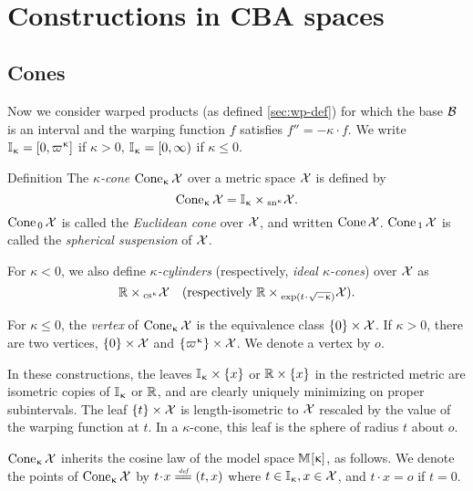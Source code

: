­%
\chapter{Constructions in CBA spaces}


\section{Cones} 
\label{sec:cones}

Now we consider warped products (as defined  \ref{sec:wp-def}) for which the base $\mathcal{B}$ is an interval   and the warping function $f$ satisfies $f''=-\kappa\cdot f$.  We write  $\II_\kappa= [0,\varpi\kappa]$ if $\kappa > 0$, $\mathbb{I}_\upkappa= [0,\infty)$ if $\kappa\le 0$.

\begin{thm}{Definition}
\label{def:cones}
The  \emph{$\kappa$-cone} $\mathop{\rm Cone}\nolimits_\upkappa \mathcal{X}$ over a metric space $\mathcal{X}$ is defined by
\[\Cone_\kappa \spc{X}= \II_\kappa\times_{\sn{\kappa} } \spc{X}.\]  
$\mathop{\rm Cone}\nolimits_{\,0}  \mathcal{X}$ is called the  \emph{Euclidean cone} over $\mathcal{X}$, and written $\mathop{\rm Cone}\nolimits \mathcal{X}$. $\mathop{\rm Cone}\nolimits_{\,1} \mathcal{X}$ is called the
 \emph{spherical suspension} of $\mathcal{X}$. 
 
 For $\kappa <0$, we  also define  \emph{$\kappa$-cylinders} (respectively, \emph{ideal $\kappa$-cones}) over $\mathcal{X}$ as 
 \[\RR\times_{\cs{\kappa}} \spc{X} 
\quad (\text{respectively }\RR\times_{\exp (t\cdot\sqrt{-\kappa})} \spc{X}).\]

For $\kappa\le 0$, the \emph{vertex} of $\mathop{\rm Cone}\nolimits_\upkappa \mathcal{X}$ is the equivalence class $\{0\}\times \spc{X}$. If $\kappa>0$, there are two vertices, $\{0\}\times \spc{X}$ and $\{\varpi\kappa\}\times \spc{X}$.  We denote a vertex by  $o$.                             \end{thm} 

 In these constructions, the leaves $\II_\kappa\times\{x\}$ or $\RR\times\{x\}$ in the restricted  metric are isometric copies of $\mathbb{I}_\upkappa$ or $\mathbb{R}$,  and are clearly uniquely minimizing on proper subintervals.
The leaf $\{t\}\times \spc{X}$ is length-isometric to $\mathcal{X}$ rescaled by the value of the warping function at $t$.  In a $\kappa$-cone, this leaf is the sphere of radius $t$ about $o$.
\ms

$\mathop{\rm Cone}\nolimits_\upkappa \mathcal{X}$ inherits the cosine law of the model space $\mathbb{M}_{{}}^{}[{\upkappa}]$, as follows.  
We denote the points of $\mathop{\rm Cone}\nolimits_\upkappa \mathcal{X}$ by $t\cdot x\df (t,x)$ where $ t\in \II_\kappa, x\in \spc{X}$, and $t\cdot x = o$ if $t=0$. 

